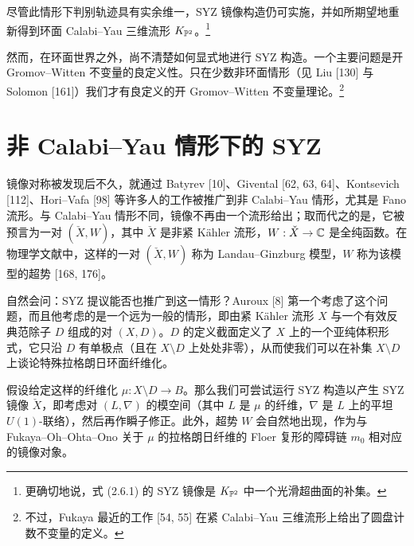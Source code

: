 尽管此情形下判别轨迹具有实余维一，SYZ 镜像构造仍可实施，并如所期望地重新得到环面 Calabi--Yau 三维流形 $K_{\mathbb{P}^2}$。\footnote{更确切地说，式 (2.6.1) 的 SYZ 镜像是 $K_{\mathbb{P}^2}$ 中一个光滑超曲面的补集。}

然而，在环面世界之外，尚不清楚如何显式地进行 SYZ 构造。一个主要问题是开 Gromov--Witten 不变量的良定义性。只在少数非环面情形（见 Liu [130] 与 Solomon [161]）我们才有良定义的开 Gromov--Witten 不变量理论。\footnote{不过，Fukaya 最近的工作 [54, 55] 在紧 Calabi--Yau 三维流形上给出了圆盘计数不变量的定义。}

\section{非 Calabi--Yau 情形下的 SYZ}
镜像对称被发现后不久，就通过 Batyrev [10]、Givental [62, 63, 64]、Kontsevich [112]、Hori--Vafa [98] 等许多人的工作被推广到非 Calabi--Yau 情形，尤其是 Fano 流形。与 Calabi--Yau 情形不同，镜像不再由一个流形给出；取而代之的是，它被预言为一对 $(\check X,W)$，其中 $\check X$ 是非紧 Kähler 流形，$W:\check X\to\mathbb{C}$ 是全纯函数。在物理学文献中，这样的一对 $(\check X,W)$ 称为 Landau--Ginzburg 模型，$W$ 称为该模型的超势 [168, 176]。

自然会问：SYZ 提议能否也推广到这一情形？Auroux [8] 第一个考虑了这个问题，而且他考虑的是一个远为一般的情形，即由紧 Kähler 流形 $X$ 与一个有效反典范除子 $D$ 组成的对 $(X,D)$。$D$ 的定义截面定义了 $X$ 上的一个亚纯体积形式，它只沿 $D$ 有单极点（且在 $X\setminus D$ 上处处非零），从而使我们可以在补集 $X\setminus D$ 上谈论特殊拉格朗日环面纤维化。

假设给定这样的纤维化 $\mu:X\setminus D\to B$。那么我们可尝试运行 SYZ 构造以产生 SYZ 镜像 $\check X$，即考虑对 $(L,\nabla)$ 的模空间（其中 $L$ 是 $\mu$ 的纤维，$\nabla$ 是 $L$ 上的平坦 $U(1)$-联络），然后再作瞬子修正。此外，超势 $W$ 会自然地出现，作为与 Fukaya--Oh--Ohta--Ono 关于 $\mu$ 的拉格朗日纤维的 Floer 复形的障碍链 $m_0$ 相对应的镜像对象。

